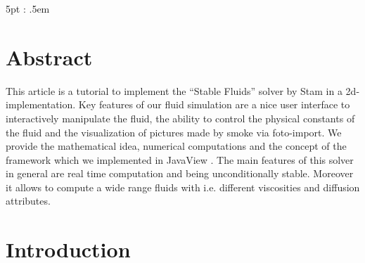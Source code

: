 \documentclass[a4paper,10pt,oneside,final,german,openbib,pdftex,titlepage]{scrbook}
\begin{document}
\mainmatter
\sloppy

    {\topsep}             %
    {5pt}             %
    {\itshape}         %
    {\parindent}       %
    {\bfseries}        %
    {:}                %
    {.5em}             %
    {}                 %

\theoremstyle{test333}
\newtheorem{test333}{TEST}
\newtheorem{thm}{Theorem}


\theoremstyle{theorem}%
\newtheorem{Lem}[thm]{Lemma}
\newtheorem{Cor}[thm]{Corollary}
\newtheorem{Def}[thm]{Definition}

\theoremstyle{definition}
\newtheorem{Rem}[thm]{Remark}



\makeatletter
\g@addto@macro{\thm@space@setup}{\thm@headpunct{:}}
\makeatother

\setcounter{chapter}{-1}
\chapter{Abstract}
This article is a tutorial to implement the ``Stable Fluids'' solver by Stam \cite{Stam} in  a 2d-implementation. Key features of our fluid simulation are a nice user interface to interactively manipulate the fluid, the ability to control the physical constants of the fluid and the visualization of pictures made by smoke via foto-import. We provide the mathematical idea, numerical computations and the concept of the framework which we implemented in JavaView \cite{JavaView}. The main features of this solver in general are real time computation and being unconditionally stable. Moreover it allows to compute a wide range fluids with i.e. different viscosities and diffusion attributes.
\linebreak
\linebreak
\newline
\noindent
\begin{minipage}{\textwidth}
\chapter{Introduction}
\end{minipage}
\end{document}
